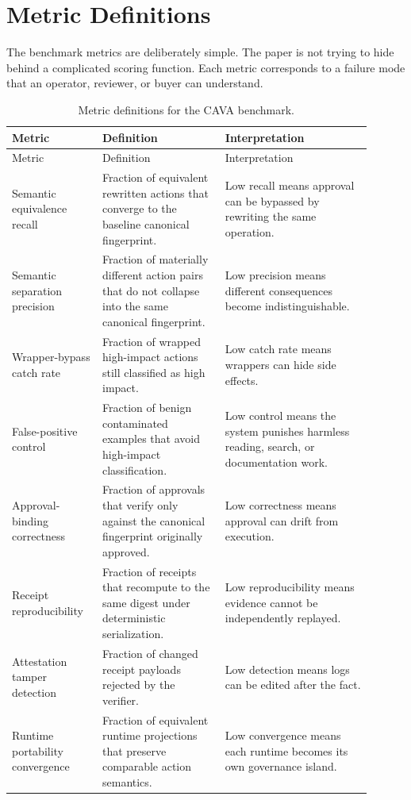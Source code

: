 \documentclass[11pt]{article}
\begin{document}
\section{Metric Definitions}

The benchmark metrics are deliberately simple. The paper is not trying to hide behind a complicated scoring function. Each metric corresponds to a failure mode that an operator, reviewer, or buyer can understand.

\begin{longtable}{@{}L{0.22\linewidth}L{0.31\linewidth}L{0.37\linewidth}@{}}
\caption{Metric definitions for the CAVA benchmark.}
\label{tab:metric-definitions}\\
\toprule
Metric & Definition & Interpretation \\
\midrule
\endfirsthead
\toprule
Metric & Definition & Interpretation \\
\midrule
\endhead
Semantic equivalence recall & Fraction of equivalent rewritten actions that converge to the baseline canonical fingerprint. & Low recall means approval can be bypassed by rewriting the same operation. \\
Semantic separation precision & Fraction of materially different action pairs that do not collapse into the same canonical fingerprint. & Low precision means different consequences become indistinguishable. \\
Wrapper-bypass catch rate & Fraction of wrapped high-impact actions still classified as high impact. & Low catch rate means wrappers can hide side effects. \\
False-positive control & Fraction of benign contaminated examples that avoid high-impact classification. & Low control means the system punishes harmless reading, search, or documentation work. \\
Approval-binding correctness & Fraction of approvals that verify only against the canonical fingerprint originally approved. & Low correctness means approval can drift from execution. \\
Receipt reproducibility & Fraction of receipts that recompute to the same digest under deterministic serialization. & Low reproducibility means evidence cannot be independently replayed. \\
Attestation tamper detection & Fraction of changed receipt payloads rejected by the verifier. & Low detection means logs can be edited after the fact. \\
Runtime portability convergence & Fraction of equivalent runtime projections that preserve comparable action semantics. & Low convergence means each runtime becomes its own governance island. \\

\end{longtable}
\end{document}
